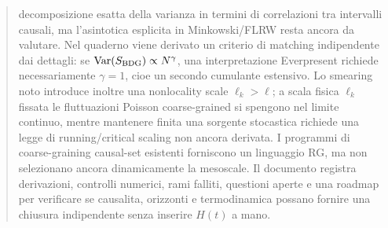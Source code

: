 \documentclass[11pt,a4paper]{article}
\begin{document}
\begin{abstract}
decomposizione esatta della varianza in termini di correlazioni tra intervalli causali, ma l'asintotica esplicita in Minkowski/FLRW resta ancora da valutare. Nel quaderno viene derivato un criterio di matching indipendente dai dettagli: se $\mathrm{Var}(S_{\rm BDG})\propto N^\gamma$, una interpretazione Everpresent richiede necessariamente $\gamma=1$, cioe un secondo cumulante estensivo. Lo smearing noto introduce inoltre una nonlocality scale $\ell_k>\ell$; a scala fisica $\ell_k$ fissata le fluttuazioni Poisson coarse-grained si spengono nel limite continuo, mentre mantenere finita una sorgente stocastica richiede una legge di running/critical scaling non ancora derivata. I programmi di coarse-graining causal-set esistenti forniscono un linguaggio RG, ma non selezionano ancora dinamicamente la mesoscale. Il documento registra derivazioni, controlli numerici, rami falliti, questioni aperte e una roadmap per verificare se causalita, orizzonti e termodinamica possano fornire una chiusura indipendente senza inserire $H(t)$ a mano.

\end{abstract}
\end{document}
